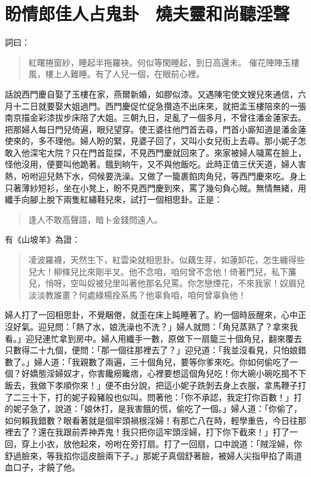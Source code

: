 
\chapter{盼情郎佳人占鬼卦　燒夫靈和尚聽淫聲}

詞曰：
\begin{quote}
紅曙捲窗紗，睡起半拖羅袂。何似等閑睡起，到日高還未。
催花陣陣玉樓風，樓上人難睡。有了人兒一個，在眼前心裡。
\end{quote}

話說西門慶自娶了玉樓在家，燕爾新婚，如膠似漆。又遇陳宅使文嫂兒來通信，六月十二日就要娶大姐過門。西門慶促忙促急攢造不出床來，就把孟玉樓陪來的一張南京描金彩漆拔步床陪了大姐。三朝九日，足亂了一個多月，不曾往潘金蓮家去。把那婦人每日門兒倚遍，眼兒望穿。使王婆往他門首去尋，門首小廝知道是潘金蓮使來的，多不理他。婦人盼的緊，見婆子回了，又叫小女兒街上去尋。那小妮子怎敢入他深宅大院？只在門首踅探，不見西門慶就回來了。來家被婦人噦罵在臉上，怪他沒用，便要叫他跪著。餓到晌午，又不與他飯吃。此時正值三伏天道，婦人害熱，吩咐迎兒熱下水，伺候要洗澡。又做了一籠裹餡肉角兒，等西門慶來吃。身上只著薄紗短衫，坐在小凳上，盼不見西門慶到來，罵了幾句負心賊。無情無緒，用纖手向腳上脫下兩隻紅繡鞋兒來，試打一個相思卦。正是：
\begin{quote}
逢人不敢高聲語，暗卜金錢問遠人。
\end{quote}
有《山坡羊》為證：
\begin{quote}
凌波羅襪，天然生下，紅雲染就相思卦。似藕生芽，如蓮卸花，怎生纏得些兒大！柳條兒比來剛半叉。他不念咱，咱何曾不念他！倚著門兒，私下簾兒，悄呀，空叫奴被兒里叫著他那名兒罵。你怎戀煙花，不來我家！奴眉兒淡淡教誰畫？何處綠楊拴系馬？他辜負咱，咱何曾辜負他！
\end{quote}

婦人打了一回相思卦，不覺睏倦，就歪在床上盹睡著了。約一個時辰醒來，心中正沒好氣。迎兒問：「熱了水，娘洗澡也不洗？」婦人就問：「角兒蒸熟了？拿來我看。」迎兒連忙拿到房中。婦人用纖手一數，原做下一扇籠三十個角兒，翻來覆去只數得二十九個，便問：「那一個往那裡去了？」迎兒道：「我並沒看見，只怕娘錯數了。」婦人道：「我親數了兩遍，三十個角兒，要等你爹來吃。你如何偷吃了一個？好嬌態淫婦奴才，你害饞癆饞痞，心裡要想這個角兒吃！你大碗小碗吃搗不下飯去，我做下孝順你來！」便不由分說，把這小妮子跣剝去身上衣服，拿馬鞭子打了二三十下，打的妮子殺豬般也似叫。問著他：「你不承認，我定打你百數！」打的妮子急了，說道：「娘休打，是我害餓的慌，偷吃了一個。」婦人道：「你偷了，如何賴我錯數？眼看著就是個牢頭禍根淫婦！有那亡八在時，輕學重告，今日往那裡去了？還在我跟前弄神弄鬼！我只把你這牢頭淫婦，打下你下截來！」打了一回，穿上小衣，放他起來，吩咐在旁打扇。打了一回扇，口中說道：「賊淫婦，你舒過臉來，等我掐你這皮臉兩下子。」那妮子真個舒著臉，被婦人尖指甲掐了兩道血口子，才饒了他。

